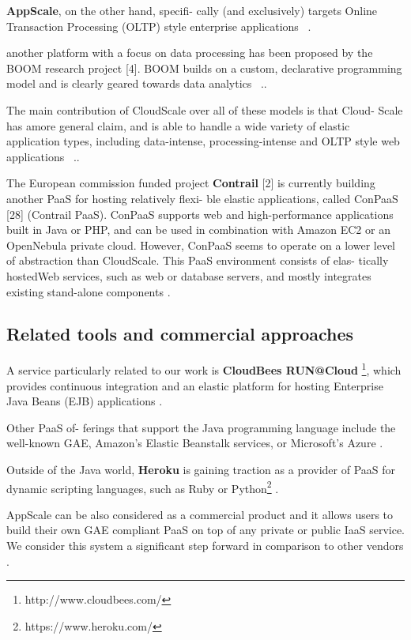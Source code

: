 \documentclass{sig-alternate}
\begin{document}
\textbf{AppScale}, on the other hand, specifi- cally (and exclusively) targets Online Transaction Processing (OLTP) style enterprise applications ~\cite{Leitner2013}.
 
another platform with a focus on data processing has been proposed by the BOOM research project [4]. BOOM builds on a custom, declarative programming model and is clearly geared towards data analytics ~\cite{Leitner2013}..

The main contribution of CloudScale over all of these models is that Cloud- Scale has amore general claim, and is able to handle a wide variety of elastic application types, including data-intense, processing-intense and OLTP style web applications ~\cite{Leitner2013}.. 

The European commission funded project \textbf{Contrail} [2] is currently building another PaaS for hosting relatively flexi- ble elastic applications, called ConPaaS [28] (Contrail PaaS). ConPaaS supports web and high-performance applications built in Java or PHP, and can be used in combination with Amazon EC2 or an OpenNebula private cloud. However, ConPaaS seems to operate on a lower level of abstraction than CloudScale. This PaaS environment consists of elas- tically hostedWeb services, such as web or database servers, and mostly integrates existing stand-alone components \cite{Leitner2013}.


\subsection{Related tools and commercial approaches}

A service particularly related to our work is \textbf{CloudBees RUN@Cloud} \footnote{http://www.cloudbees.com/}, which provides continuous integration and an elastic platform for hosting Enterprise Java Beans (EJB) applications \cite{Leitner2013}.

Other PaaS of- ferings that support the Java programming language include the well-known GAE, Amazon’s Elastic Beanstalk services, or Microsoft’s Azure \cite{Leitner2013}. 

Outside of the Java world,\textbf{ Heroku} is gaining traction as a provider of PaaS for dynamic scripting languages, such as Ruby or Python\footnote{https://www.heroku.com/} \cite{Leitner2013}.

AppScale can be also considered as a commercial product and it allows users to build their own GAE compliant PaaS on top of any private or public IaaS service. We consider this system a significant step forward in comparison to other vendors \cite{Leitner2013}.
\end{document}
